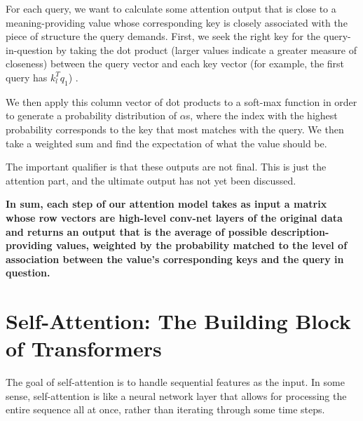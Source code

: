 \documentclass[10pt,a4paper]{book}
\begin{document}
For each query, we want to calculate some attention output that is close to a meaning-providing value whose corresponding key is closely associated with the piece of structure the query demands. First, we seek the right key for the query-in-question by taking the dot product (larger values indicate a greater measure of closeness) between the query vector and each key vector (for example, the first query has $k_l^T q_1$) .

We then apply this column vector of dot products to a soft-max function in order to generate a probability distribution of $\alpha$s, where the index with the highest probability corresponds to the key that most matches with the query. We then take a weighted sum and find the expectation of what the value should be.

The important qualifier is that these outputs are not final. This is just the attention part, and the ultimate output has not yet been discussed.

\textbf{In sum, each step of our attention model takes as input a matrix whose row vectors are high-level conv-net layers of the original data and returns an output that is the average of possible description-providing values, weighted by the probability matched to the level of association between the value's corresponding keys and the query in question.}

\section{Self-Attention: The Building Block of Transformers}
The goal of self-attention is to handle sequential features as the input. In some sense, self-attention is like a neural network layer that allows for processing the entire sequence all at once, rather than iterating through some time steps.
\end{document}

